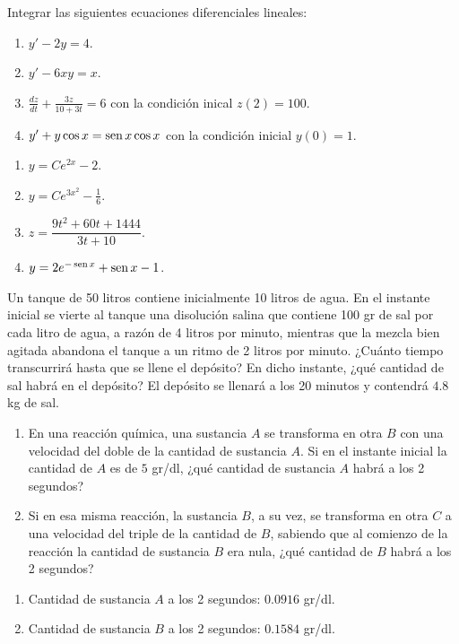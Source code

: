 
{Integrar las siguientes ecuaciones diferenciales lineales:
\begin{enumerate}
\item $y'-2y=4$.
\item $y'-6xy=x$.
\item $\frac{dz}{dt}+\frac{3z}{10+3t}=6$ con la condición inical $z(2)=100$.
\item $y'+y\cos x=\operatorname{sen} x\cos x$ con la condición inicial $y(0)=1$.
\end{enumerate}
}
{
\begin{enumerate}
\item $y=Ce^{2x}-2$.
\item $y=Ce^{3x^2}-\frac{1}{6}$.
\item $z=\dfrac{9t^2+60t+1444}{3t+10}$.
\item $y=2e^{-\operatorname{sen} x}+\operatorname{sen} x -1$.
\end{enumerate}
}
{}


{Un tanque de 50 litros contiene inicialmente 10 litros de agua. En el instante inicial se vierte al tanque una disolución salina que
contiene 100 gr de sal por cada litro de agua, a razón de 4 litros por minuto, mientras que la mezcla bien agitada abandona el tanque a un
ritmo de 2 litros por minuto. ¿Cuánto tiempo transcurrirá hasta que se llene el depósito? En dicho instante, ¿qué cantidad de sal habrá en
el depósito?}
{El depósito se llenará a los 20 minutos y contendrá $4.8$ kg de sal. 
}
{}


{\begin{enumerate}
\item En una reacción química, una sustancia $A$ se transforma en otra $B$ con una velocidad del doble de la cantidad de
sustancia $A$.
Si en el instante inicial la cantidad de $A$ es de $5$ gr/dl, ¿qué cantidad de sustancia $A$ habrá a los 2 segundos? 

\item Si en esa misma reacción, la sustancia $B$, a su vez, se transforma en otra $C$ a una velocidad del triple de la
cantidad de $B$, sabiendo que al comienzo de la reacción la cantidad de sustancia $B$ era nula, ¿qué cantidad de $B$
habrá a los 2 segundos?
\end{enumerate}
}
{\begin{enumerate}
\item Cantidad de sustancia $A$ a los 2 segundos: $0.0916$ gr/dl.
\item Cantidad de sustancia $B$ a los 2 segundos: $0.1584$ gr/dl.
\end{enumerate}
}
{}